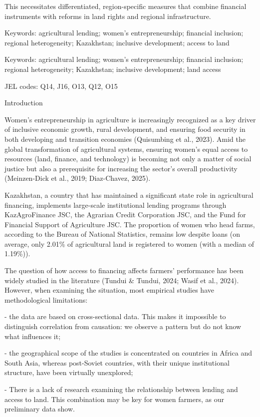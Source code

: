 \documentclass[
]{article}
\begin{document}
This necessitates differentiated, region-specific measures that combine
financial instruments with reforms in land rights and regional
infrastructure.

Keywords: agricultural lending; women's entrepreneurship; financial
inclusion; regional heterogeneity; Kazakhstan; inclusive development;
access to land

Keywords: agricultural lending; women's entrepreneurship; financial
inclusion; regional heterogeneity; Kazakhstan; inclusive development;
land access

JEL codes: Q14, J16, O13, Q12, O15

Introduction

Women's entrepreneurship in agriculture is increasingly recognized as a
key driver of inclusive economic growth, rural development, and ensuring
food security in both developing and transition economies (Quisumbing et
al., 2023). Amid the global transformation of agricultural systems,
ensuring women's equal access to resources (land, finance, and
technology) is becoming not only a matter of social justice but also a
prerequisite for increasing the sector's overall productivity
(Meinzen-Dick et al., 2019; Diaz-Chavez, 2025).

Kazakhstan, a country that has maintained a significant state role in
agricultural financing, implements large-scale institutional lending
programs through KazAgroFinance JSC, the Agrarian Credit Corporation
JSC, and the Fund for Financial Support of Agriculture JSC. The
proportion of women who head farms, according to the Bureau of National
Statistics, remains low despite loans (on average, only 2.01\% of
agricultural land is registered to women (with a median of 1.19\%)).

The question of how access to financing affects farmers' performance has
been widely studied in the literature (Tundui \& Tundui, 2024; Wasif et
al., 2024). However, when examining the situation, most empirical
studies have methodological limitations:

- the data are based on cross-sectional data. This makes it impossible
to distinguish correlation from causation: we observe a pattern but do
not know what influences it;

- the geographical scope of the studies is concentrated on countries in
Africa and South Asia, whereas post-Soviet countries, with their unique
institutional structure, have been virtually unexplored;

- There is a lack of research examining the relationship between lending
and access to land. This combination may be key for women farmers, as
our preliminary data show.
\end{document}
